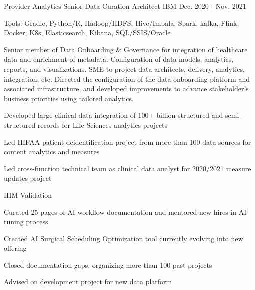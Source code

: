 \begin{cventries}
  \cvexpentry
    {Provider Analytics} %
    {Senior Data Curation Architect} %
    {IBM}
    {Dec. 2020 - Nov. 2021}
    {
      \begin{cvheavyparagraph}
        Tools: Gradle, Python/R, Hadoop/HDFS, Hive/Impala, Spark, kafka, Flink, Docker, K8s, Elasticsearch, Kibana, SQL/SSIS/Oracle
      \end{cvheavyparagraph}
    }
    {
      \begin{cvparagraph}
        Senior member of Data Onboarding \& Governance for integration of healthcare data and enrichment of metadata. Configuration of data models, analytics, reports, and visualizations. SME to project data architects, delivery, analytics, integration, etc. Directed the configuration of the data onboarding platform and associated infrastructure, and developed improvements to advance stakeholder’s business priorities using tailored analytics.
      \end{cvparagraph}
      \begin{cvitems} %
      \item {Developed large clinical data integration of 100+ billion structured and semi-structured records for Life Sciences analytics projects}
      \item {Led HIPAA patient deidentification project from more than 100 data sources for content analytics and measures}
        \item {Led cross-function technical team as clinical data analyst for 2020/2021 measure updates project}
        \item {IHM Validation}
        \item {Curated 25 pages of AI workflow documentation and mentored new hires in AI tuning process}
        \item {Created AI Surgical Scheduling Optimization tool currently evolving into new offering}
        \item {Closed documentation gaps, organizing more than 100 past projects}
        \item {Advised on development project for new data platform}
      \end{cvitems}
    }


\end{cventries}

